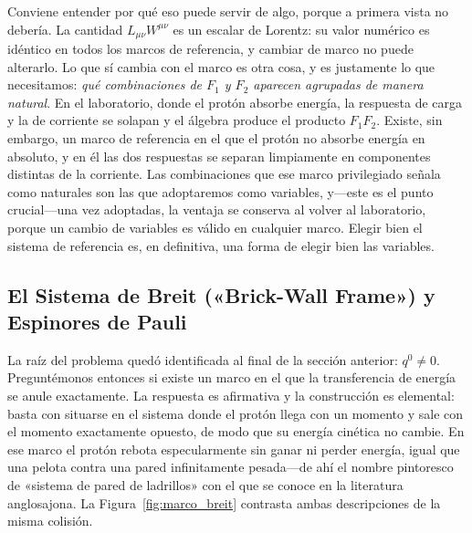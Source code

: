 \documentclass[10pt,a4paper]{article}
\begin{document}
Conviene entender por qué eso puede servir de algo, porque a primera vista no debería. La cantidad $L_{\mu\nu}W^{\mu\nu}$ es un escalar de Lorentz: su valor numérico es idéntico en todos los marcos de referencia, y cambiar de marco no puede alterarlo. Lo que sí cambia con el marco es otra cosa, y es justamente lo que necesitamos: \emph{qué combinaciones de $F_1$ y $F_2$ aparecen agrupadas de manera natural}. En el laboratorio, donde el protón absorbe energía, la respuesta de carga y la de corriente se solapan y el álgebra produce el producto $F_1F_2$. Existe, sin embargo, un marco de referencia en el que el protón no absorbe energía en absoluto, y en él las dos respuestas se separan limpiamente en componentes distintas de la corriente. Las combinaciones que ese marco privilegiado señala como naturales son las que adoptaremos como variables, y---este es el punto crucial---una vez adoptadas, la ventaja se conserva al volver al laboratorio, porque un cambio de variables es válido en cualquier marco. Elegir bien el sistema de referencia es, en definitiva, una forma de elegir bien las variables.

\subsection{El Sistema de Breit («Brick-Wall Frame») y Espinores de Pauli}
La raíz del problema quedó identificada al final de la sección anterior: $q^0 \neq 0$. Preguntémonos entonces si existe un marco en el que la transferencia de energía se anule exactamente. La respuesta es afirmativa y la construcción es elemental: basta con situarse en el sistema donde el protón llega con un momento y sale con el momento exactamente opuesto, de modo que su energía cinética no cambie. En ese marco el protón rebota especularmente sin ganar ni perder energía, igual que una pelota contra una pared infinitamente pesada---de ahí el nombre pintoresco de «sistema de pared de ladrillos» con el que se conoce en la literatura anglosajona. La Figura~\ref{fig:marco_breit} contrasta ambas descripciones de la misma colisión.
\end{document}
